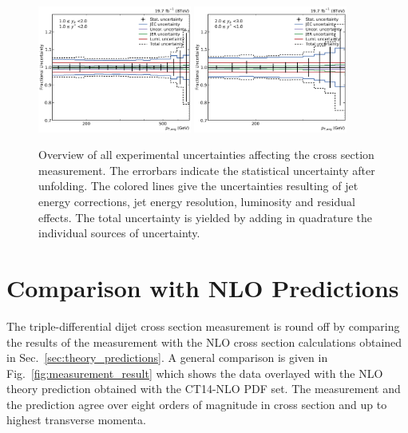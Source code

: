 \begin{figure}[htbp]
    \includegraphics[width=0.45\textwidth]{figures/measurement/exp_unc_overview_yb1ys1.pdf}\hfill
    \includegraphics[width=0.45\textwidth]{figures/measurement/exp_unc_overview_yb2ys0.pdf}
    \caption[Overview of experimental uncertainties]{Overview of all
    experimental uncertainties affecting the cross section measurement. The
    errorbars indicate the statistical uncertainty after unfolding. The colored
    lines give the uncertainties resulting of jet energy corrections, jet energy
    resolution, luminosity and residual effects. The total uncertainty is yielded by
    adding in quadrature the individual sources of uncertainty.}
    \label{fig:exp_unc_overview}
\end{figure}

\section{Comparison with NLO Predictions}
\label{sec:nlo_comparisons}

The triple-differential dijet cross section measurement is round off by
comparing the results of the measurement with the NLO cross section calculations
obtained in Sec.~\ref{sec:theory_predictions}. A general comparison is given in
Fig.~\ref{fig:measurement_result} which shows the data overlayed with the NLO
theory prediction obtained with the CT14-NLO PDF set. The measurement and the
prediction agree over eight orders of magnitude in cross section and up to
highest transverse momenta.

